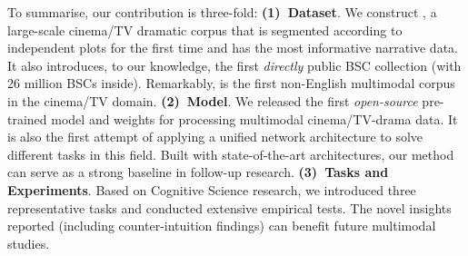 To summarise, our contribution is three-fold: \textbf{(1)~Dataset}. We construct \TVD, a large-scale cinema/TV dramatic corpus that is segmented according to independent plots for the first time and has the most informative narrative data. It also introduces, to our knowledge, the first \textit{directly} public BSC collection (with 26 million BSCs inside).
Remarkably, \TVD is the first non-English multimodal corpus in the cinema/TV domain. \textbf{(2)~Model}. We released the first \textit{open-source} pre-trained model and weights for processing multimodal cinema/TV-drama data. It is also the first attempt of applying a unified network architecture to solve different tasks in this field. Built with state-of-the-art architectures, our method can serve as a strong baseline in follow-up research. \textbf{(3)~Tasks and Experiments}. Based on Cognitive Science research, we introduced three representative tasks and conducted extensive empirical tests. The novel insights reported (including counter-intuition findings) can benefit future multimodal studies. 

